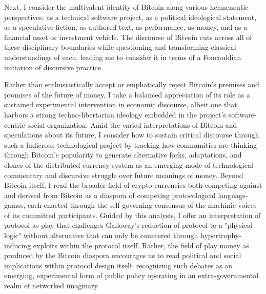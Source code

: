 Next, I consider the multivalent identity of Bitcoin along various hermeneutic perspectives: as a technical software project, as a political ideological statement, as a speculative fiction, as authored text, as performance, as money, and as a financial asset or investment vehicle. The discourse of Bitcoin cuts across all of these disciplinary boundaries while questioning and transforming classical understandings of each, leading me to consider it in terms of a Foucauldian initiation of discursive practice.

Rather than enthusiastically accept or emphatically reject Bitcoin's premises and promises of the future of money, I take a balanced appreciation of its role as a sustained experimental intervention in economic discourse, albeit one that harbors a strong techno-libertarian ideology embedded in the project's software-centric social organization. Amid the varied interpretations of Bitcoin and speculations about its future, I consider how to sustain critical discourse through such a ludicrous technological project by tracking how communities are thinking through Bitcoin's popularity to generate alternative forks, adaptations, and clones of the distributed currency system as an emerging mode of technological commentary and discursive struggle over future meanings of money. Beyond Bitcoin itself, I read the broader field of crypto-currencies both competing against and derived from Bitcoin as a diaspora of competing protocological language-games, each enacted through the self-governing consensus of the machinic voices of its committed participants. Guided by this analysis, I offer an interpretation of protocol as play that challenges Galloway's reduction of protocol to a "physical logic" without alternative that can only be countered through hypertrophy-inducing exploits within the protocol itself. Rather, the field of play money as produced by the Bitcoin diaspora encourages us to read political and social implications within protocol design itself, recognizing such debates as an emerging, experimental form of public policy operating in an extra-governmental realm of networked imaginary.


